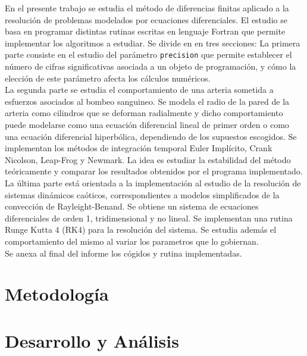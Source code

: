\documentclass[letterpaper]{article}
\begin{document}
En el presente trabajo se estudia el método de diferencias finitas aplicado a la resolución de problemas modelados por ecuaciones diferenciales. El estudio se basa en programar distintas rutinas escritas en lenguaje Fortran que permite implementar los algoritmos a estudiar. Se divide en en tres secciones: La primera parte  consiste en el estudio del parámetro \texttt{precision} que permite establecer el número de cifras significativas asociada a un objeto de programación, y cómo la elección de este parámetro afecta los cálculos numéricos. \\

La segunda parte se estudia el comportamiento de una arteria sometida a esfuerzos asociados al bombeo sanguineo. Se modela el radio de la pared de la arteria como cilindros que se deforman radialmente y dicho comportamiento puede modelarse como una ecuación diferencial lineal de primer orden o como una ecuación diferencial hiperbólica, dependiendo de los supuestos escogidos. Se implementan los métodos de integración temporal Euler Implícito, Crank Nicolson, Leap-Frog y Newmark. La idea es estudiar la estabilidad del método teóricamente y comparar los resultados obtenidos por el programa implementado.\\

La última parte está orientada a la implementación al estudio de la resolución de sistemas dinámicos caóticos, correspondientes a modelos simplificados de la convección de Rayleight-Benand. Se obtiene un sistema de ecuaciones diferenciales de orden 1, tridimensional y no lineal. Se implementan una rutina Runge Kutta 4 (RK4) para la resolución del sistema. Se estudia además el comportamiento del mismo al variar los parametros que lo gobiernan.\\

Se anexa al final del informe los cógidos y rutina implementadas.




\newpage

\section{Metodología}


\newpage

\section{Desarrollo y Análisis} \label{DESARROLLO_Y_ANALISIS}
\end{document}
